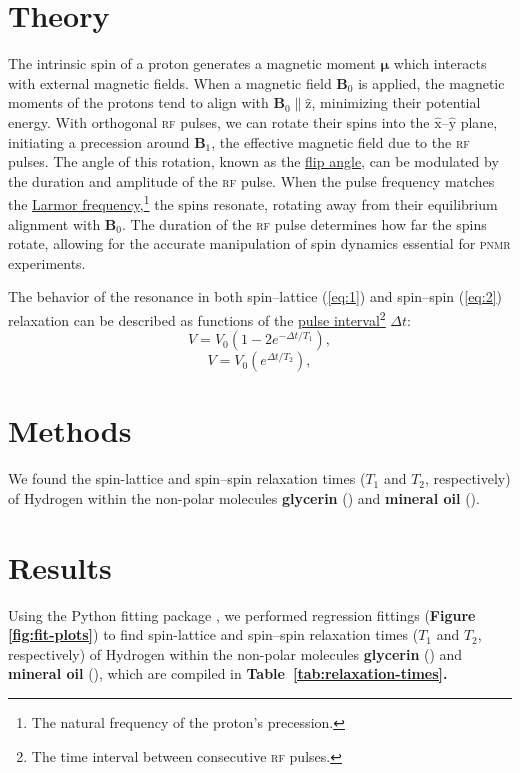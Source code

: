 \documentclass[12pt]{report}
\begin{document}
\section*{Theory}
{
    The intrinsic spin of a proton generates a magnetic moment $\bm{\mu}$ which interacts with external magnetic fields. When a magnetic field $\bm{B}_0$ is applied, the magnetic moments of the protons tend to align with $\bm{B}_0 \parallel \hat{\mathrm{z}}$, minimizing their potential energy. With orthogonal \textsc{rf} pulses, we can rotate their spins into the $\hat{\mathrm{x}}$–$\hat{\mathrm{y}}$ plane, initiating a precession around $\bm{B}_1$, the effective magnetic field due to the \textsc{rf} pulses. The angle of this rotation, known as the \ul{flip angle}, can be modulated by the duration and amplitude of the \textsc{rf} pulse. When the pulse frequency matches the \ul{Larmor frequency},\footnote{The natural frequency of the proton's precession.} the spins resonate, rotating away from their equilibrium alignment with $\bm{B}_0$. The duration of the \textsc{rf} pulse determines how far the spins rotate, allowing for the accurate manipulation of spin dynamics essential for \textsc{pnmr} experiments.

    The behavior of the resonance in both spin–lattice (\ref{eq:1}) and spin–spin (\ref{eq:2}) relaxation can be described as functions of the \ul{pulse interval}\footnote{The time interval between consecutive \textsc{rf} pulses.} $\Delta t$:
    \begin{equation}
        V = V_{0} \left( 1 - 2e^{-\Delta t/T_{1}} \right)\!,
        \label{eq:1}
    \end{equation}
    \begin{equation}
        V = V_{0} \left( e^{\Delta t / T_{2}} \right)\!,
        \label{eq:2}
    \end{equation}
}

\section*{Methods}
{
    We found the spin-lattice and spin–spin relaxation times ($T_1$ and $T_2$, respectively) of Hydrogen within the non-polar molecules \textbf{glycerin} () and \textbf{mineral oil} ().
}

\section*{Results}
{
    Using the Python fitting package , we performed regression fittings (\textbf{Figure~ \ref{fig:fit-plots}}) to find spin-lattice and spin–spin relaxation times ($T_1$ and $T_2$, respectively) of Hydrogen within the non-polar molecules \textbf{glycerin} () and \textbf{mineral oil} (), which are compiled in \textbf{Table\ \ref{tab:relaxation-times}.}
}
\end{document}
